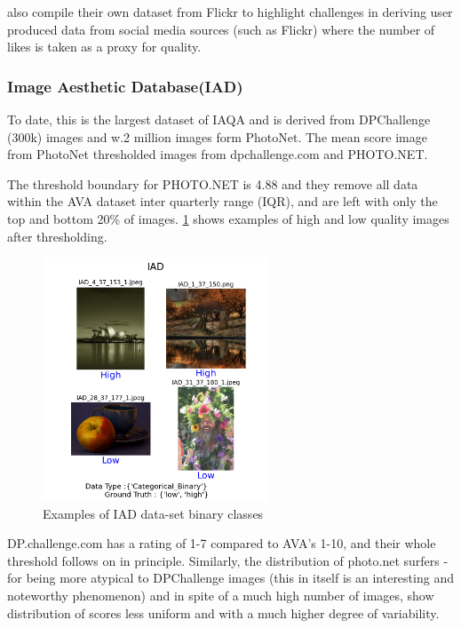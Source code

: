 \cite{Schifanella2015} also compile their own dataset from Flickr to highlight challenges in deriving user produced data from social media sources (such as Flickr) where the number of  likes is taken as a proxy for quality.

\pagebreak





\subsubsection{Image Aesthetic Database(IAD)}

To date, this is the largest dataset of IAQA and is derived from DPChallenge (300k) images and w.2 million images form PhotoNet. The mean score image from PhotoNet\cite[12]{Lu2015a} thresholded images from dpchallenge.com and PHOTO.NET. 

The threshold boundary for PHOTO.NET is 4.88 and they remove all data within the AVA dataset inter quarterly range (IQR), and are left with only the top and bottom 20\% of images.  \ref{fig:IAD} shows examples of high and low quality images after thresholding. 

\begin{figure}[hp]
\centering
\includegraphics[width=0.6\textwidth]{figures/database_ims/IAD.png}
  \caption{\label{fig:IAD} Examples of IAD data-set binary classes}
\end{figure}
DP.challenge.com has a rating of 1-7 compared to AVA's 1-10, and their whole threshold follows on in principle. Similarly, the distribution of photo.net surfers  - for being more atypical to DPChallenge images (this in itself is an interesting and noteworthy phenomenon) and in spite of a much high number of images, show distribution of scores less uniform and with a much higher degree of variability.

